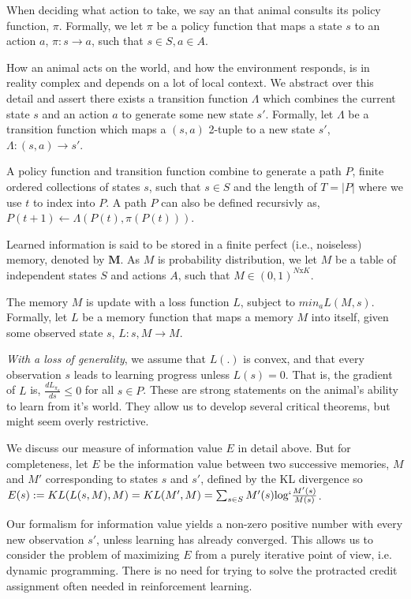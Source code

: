 \documentclass[9pt,twocolumn,twoside]{pnas-new}
\begin{document}
When deciding what action to take, we say an that animal consults its policy function, $\pi$. Formally, we let $\pi$ be a policy function that maps a state $s$ to an action $a$, $\pi : s \rightarrow a$, such that $s \in S, a \in A$.

How an animal acts on the world, and how the environment responds, is in reality complex and depends on a lot of local context. %
 We abstract over this detail and assert there exists a transition function $\Lambda$ which combines the current state $s$ and an action $a$ to generate some new state $s'$. Formally, let $\Lambda$ be a transition function which maps a $(s,a)$ 2-tuple to a new state $s'$, $\Lambda : (s, a) \rightarrow s'$. 

A policy function and transition function combine to generate a path $P$, finite ordered collections of states $s$, such that $s \in S$ and the length of $T = |P|$ where we use $t$ to index into $P$. A path $P$ can also be defined recursivly as, $P(t+1) \leftarrow \Lambda(P(t), \pi(P(t)))$.

Learned information is said to be stored in a finite perfect (i.e., noiseless) memory, denoted by $\textbf{M}$. As $M$ is probability distribution, we let $M$ be a table of independent states $S$ and actions $A$, such that $M \in (0, 1)^{N\text{x}K}$. %

The memory $M$ is update with a loss function $L$, subject to $min_a L(M, {s})$. Formally, let $L$ be a memory function that maps a memory $M$ into itself, given some observed state $s$, $L : s, M \rightarrow M$. 


\textit{With a loss of generality}, we assume that $L(.)$ is convex, and that every observation $s$ leads to learning progress unless $L(s) = 0$. That is, the gradient of $L$ is, $\frac{dL_{\pi_{a}}}{ds} \leq 0$ for all $s \in P$. These are strong statements on the animal's ability to learn from it's world. They allow us to develop several critical theorems, but might seem overly restrictive.

We discuss our measure of information value $E$ in detail above. But for completeness, let $E$ be the information value between two successive memories, $M$ and $M'$ corresponding to states $s$ and $s'$, defined by the KL divergence so $E(s) := KL(L(s, M), M) = KL(M', M) = \sum_{s \in S} M'(s) \text{log} `\frac{M'(s)}{M(s)} $. 

Our formalism for information value yields a non-zero positive number with every new observation $s'$, unless learning has already converged. This allows us to consider the problem of maximizing $E$ from a purely iterative point of view, i.e. dynamic programming. There is no need for trying to solve the protracted credit assignment often needed in reinforcement learning.
\end{document}
